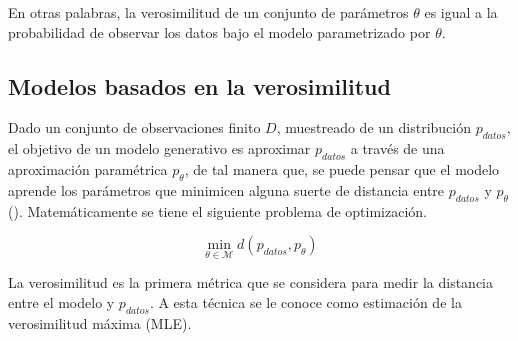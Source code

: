 
En otras palabras, la verosimilitud de un conjunto de parámetros $\theta$ es igual a la probabilidad de observar los datos bajo el modelo parametrizado por $\theta$.

\subsection{Modelos basados en la verosimilitud}

Dado un conjunto de observaciones finito $D$, muestreado de un distribución $p_{datos}$, el objetivo de un modelo generativo es aproximar $p_{datos}$ a través de una aproximación paramétrica $p_\theta$, de tal manera que, se puede pensar que el modelo aprende los parámetros que minimicen alguna suerte de distancia entre $p_{datos}$ y $p_\theta$ (). Matemáticamente se tiene el siguiente problema de optimización.


\begin{equation}
	\label{eq:dist}
	\min_{\theta \in \mathcal{M} } d( p_{datos}, p_\theta )
\end{equation}

La verosimilitud es la primera métrica que se considera para medir la distancia entre el modelo y $p_{datos}$. A esta técnica se le conoce como estimación de la verosimilitud máxima (MLE).

